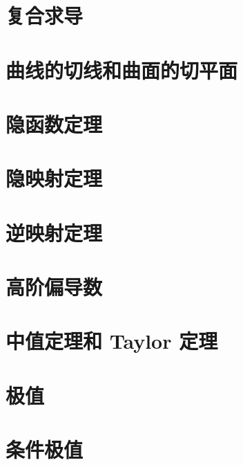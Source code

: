 \documentclass[a4paper, 11pt]{ctexbook}
\begin{document}
        \section{复合求导}
        \section{曲线的切线和曲面的切平面}
        \section{隐函数定理}
        \section{隐映射定理}
        \section{逆映射定理}
        \section{高阶偏导数}
        \section{中值定理和 Taylor 定理}
        \section{极值}
        \section{条件极值}
\end{document}
